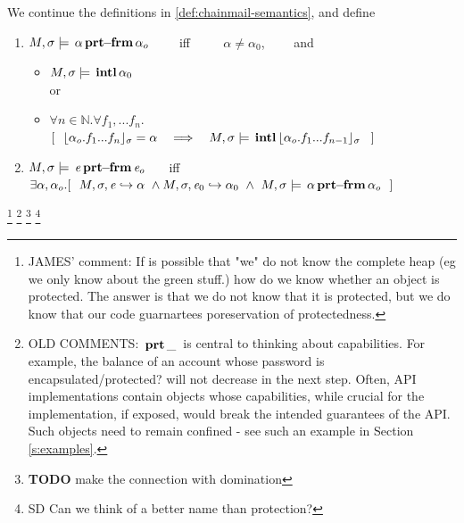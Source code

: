 
\begin{definition} 
\label{def:chainmail-protection-from}
\label{sect:semantics:assert:prtFrom}
We continue the definitions in \ref{def:chainmail-semantics}, and define   
\begin{enumerate}
\item
\label{cProtected}
 $M , \sigma \models {\ensuremath{\, {\alpha}\, \mathbf{prt\!\!-\!\!frm}}\, {\alpha_{o}}}$  \ \ \ \ iff  \ \ \ \ 
 $\alpha\neq \alpha_0$,
 \ \ \ \  and
  \begin{itemize}
 \item
 $M , \sigma \models {\ensuremath{\, \mathbf{intl}}\, \alpha_0\, }$
 \\
 or
 \item
$\forall n\in\mathbb{N}. \forall f_1,...f_n.$
$
[\ \ \interpret{\sigma}{\alpha_{o}.f_1...f_n}=\alpha \ \ \  \Longrightarrow \ \ \ \satisfiesA{M} {\sigma} {\internal{{\interpret{\sigma}{\alpha_{o}.f_1...f_{n-1}}}}}\ \ ]$
\end{itemize}
\item
$M , \sigma \models {\ensuremath{\, {\mathit{e}}\, \mathbf{prt\!\!-\!\!frm}}\, {\mathit{e}_{o}}}$  \ \ \ iff \\
  $\exists \alpha, \alpha_{o}. [\  \ \eval{M}{\sigma}{{\re}}{\alpha}\ \wedge \eval{M}{\sigma}{{\re_0}}{\alpha_0} \  \wedge \ 
  \satisfiesA{M}{\sigma}{\protectedFrom{{\alpha}} {{\alpha_{o}}}}
 \ \  ]$
 \end{enumerate}
 \end{definition} 

\footnote{JAMES' comment: If is possible that "we" do not know the complete heap (eg we only know about the green stuff.) how do we know whether an object is protected. The answer is that we do not know that it is protected, but we do know that our code guarnartees poreservation of protectedness.
}
\footnote{
OLD COMMENTS: ${{\, \mathbf{prt}\, \_\, }}$  is central to thinking about capabilities. For example, the balance of an account whose
  password is  encapsulated/protected?  will not decrease in the next step.
  Often, API implementations contain objects whose capabilities, while  crucial for the implementation, if exposed,
would break the intended guarantees of the API. Such objects need to remain confined - see
such an example in Section \ref{s:examples}. 
}
\footnote{{\textbf{TODO} make the connection with domination}}
\footnote{SD Can we think of a better name than protection? }

